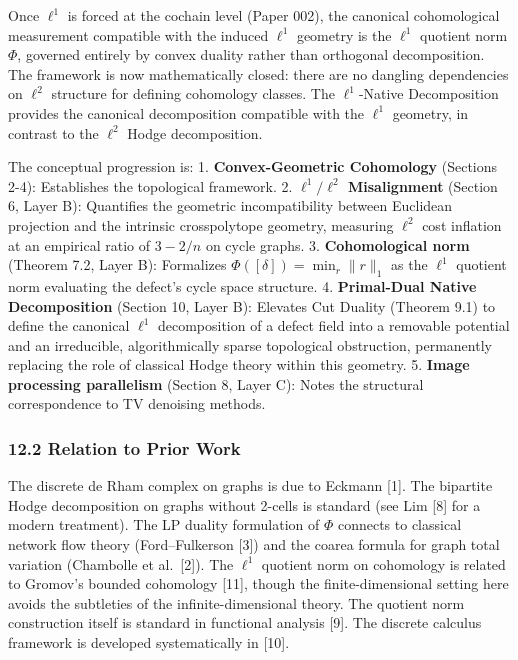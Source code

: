 \documentclass[
]{article}
\begin{document}
Once \(\ell^1\) is forced at the cochain level (Paper 002), the
canonical cohomological measurement compatible with the induced
\(\ell^1\) geometry is the \(\ell^1\) quotient norm \(\Phi\), governed
entirely by convex duality rather than orthogonal decomposition. The
framework is now mathematically closed: there are no dangling
dependencies on \(\ell^2\) structure for defining cohomology classes.
The \(\ell^1\)-Native Decomposition provides the canonical decomposition
compatible with the \(\ell^1\) geometry, in contrast to the \(\ell^2\)
Hodge decomposition.

The conceptual progression is: 1. \textbf{Convex-Geometric Cohomology}
(Sections 2-4): Establishes the topological framework. 2.
\textbf{\(\ell^1/\ell^2\) Misalignment} (Section 6, Layer B): Quantifies
the geometric incompatibility between Euclidean projection and the
intrinsic crosspolytope geometry, measuring \(\ell^2\) cost inflation at
an empirical ratio of \(3 - 2/n\) on cycle graphs. 3.
\textbf{Cohomological norm} (Theorem 7.2, Layer B): Formalizes
\(\Phi([\delta]) = \min_r \|r\|_1\) as the \(\ell^1\) quotient norm
evaluating the defect's cycle space structure. 4. \textbf{Primal-Dual
Native Decomposition} (Section 10, Layer B): Elevates Cut Duality
(Theorem 9.1) to define the canonical \(\ell^1\) decomposition of a
defect field into a removable potential and an irreducible,
algorithmically sparse topological obstruction, permanently replacing
the role of classical Hodge theory within this geometry. 5.
\textbf{Image processing parallelism} (Section 8, Layer C): Notes the
structural correspondence to TV denoising methods.

\subsubsection{12.2 Relation to Prior
Work}\label{relation-to-prior-work}

The discrete de Rham complex on graphs is due to Eckmann {[}1{]}. The
bipartite Hodge decomposition on graphs without 2-cells is standard (see
Lim {[}8{]} for a modern treatment). The LP duality formulation of
\(\Phi\) connects to classical network flow theory (Ford--Fulkerson
{[}3{]}) and the coarea formula for graph total variation (Chambolle et
al.~{[}2{]}). The \(\ell^1\) quotient norm on cohomology is related to
Gromov's bounded cohomology {[}11{]}, though the finite-dimensional
setting here avoids the subtleties of the infinite-dimensional theory.
The quotient norm construction itself is standard in functional analysis
{[}9{]}. The discrete calculus framework is developed systematically in
{[}10{]}.
\end{document}
